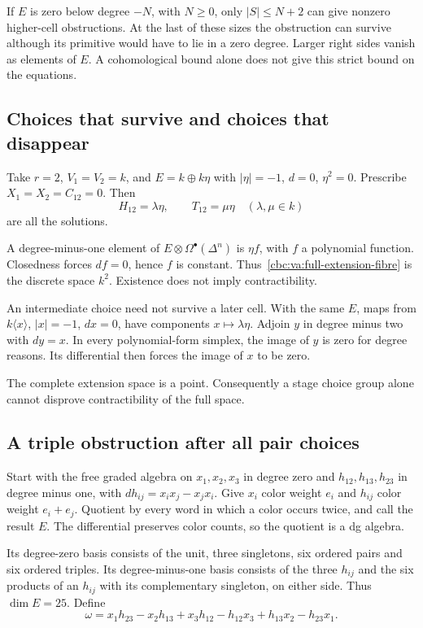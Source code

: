 If $E$ is zero below degree $-N$, with $N\geq0$,
only $|S|\leq N+2$ can give nonzero higher-cell
obstructions. At the last of these sizes the
obstruction can survive although its primitive
would have to lie in a zero degree. Larger
right sides vanish as elements of $E$.
A cohomological bound alone does not give this
strict bound on the equations.

\subsection{Choices that survive and choices that disappear}

Take $r=2$, $V_1=V_2=k$, and
$E=k\oplus k\eta$ with $|\eta|=-1$, $d=0$,
$\eta^2=0$. Prescribe $X_1=X_2=C_{12}=0$.
Then
\[
 H_{12}=\lambda\eta,\qquad T_{12}=\mu\eta
                         \quad(\lambda,\mu\in k)
\]
are all the solutions.

A degree-minus-one
element of $E\otimes\Omega^\bullet(\Delta^n)$
is $\eta f$, with $f$ a polynomial function.
Closedness forces $df=0$, hence $f$ is constant.
Thus~\eqref{cbc:va:full-extension-fibre} is the
discrete space $k^2$. Existence does not imply
contractibility.

An intermediate choice need not survive a later
cell. With the same $E$, maps from
$k\langle x\rangle$, $|x|=-1$, $dx=0$, have
components $x\mapsto\lambda\eta$.
Adjoin $y$ in degree minus two with $dy=x$.
In every polynomial-form simplex, the image of
$y$ is zero for degree reasons. Its differential
then forces the image of $x$ to be zero.

The complete extension space is a point.
Consequently a stage choice group alone cannot
disprove contractibility of the full space.

\subsection{A triple obstruction after all pair choices}

Start with the free graded algebra on $x_1,x_2,x_3$
in degree zero and $h_{12},h_{13},h_{23}$ in
degree minus one, with
$dh_{ij}=x_ix_j-x_jx_i$.
Give $x_i$ color weight $e_i$ and $h_{ij}$ color
weight $e_i+e_j$. Quotient by every word in
which a color occurs twice, and call the result
$E$. The differential preserves color counts,
so the quotient is a dg algebra.

Its degree-zero basis consists of the unit,
three singletons, six ordered pairs and six
ordered triples. Its degree-minus-one basis
consists of the three $h_{ij}$ and the six
products of an $h_{ij}$ with its complementary
singleton, on either side. Thus $\dim E=25$.
Define
\begin{equation}\label{cbc:va:omega}
 \omega=x_1h_{23}-x_2h_{13}+x_3h_{12}
             -h_{12}x_3+h_{13}x_2-h_{23}x_1.
\end{equation}

